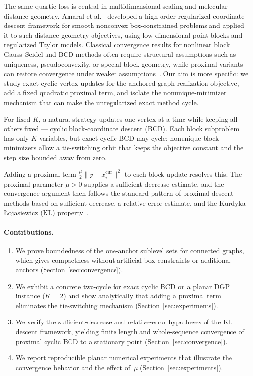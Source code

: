 \documentclass[11pt]{article}
\begin{document}
The same quartic loss is central in multidimensional scaling and molecular distance geometry.  Amaral et al.~\cite{amaral2022complexity} developed a high-order regularized coordinate-descent framework for smooth nonconvex box-constrained problems and applied it to such distance-geometry objectives, using low-dimensional point blocks and regularized Taylor models.  Classical convergence results for nonlinear block Gauss--Seidel and BCD methods often require structural assumptions such as uniqueness, pseudoconvexity, or special block geometry, while proximal variants can restore convergence under weaker assumptions~\cite{grippo2000convergence,tseng2001convergence,wright2015coordinate}.  Our aim is more specific: we study exact cyclic vertex updates for the anchored graph-realization objective, add a fixed quadratic proximal term, and isolate the nonunique-minimizer mechanism that can make the unregularized exact method cycle.

For fixed \(K\), a natural strategy updates one vertex at a time while keeping all others fixed — cyclic block-coordinate descent (BCD).  Each block subproblem has only \(K\) variables, but exact cyclic BCD may cycle: nonunique block minimizers allow a tie-switching orbit that keeps the objective constant and the step size bounded away from zero.

Adding a proximal term $\frac{\mu}{2}\|y-x_i^{\text{cur}}\|^2$ to each block update resolves this.  The proximal parameter $\mu>0$ supplies a sufficient-decrease estimate, and the convergence argument then follows the standard pattern of proximal descent methods based on sufficient decrease, a relative error estimate, and the Kurdyka--\L{}ojasiewicz (KL) property~\cite{attouch2010proximal,attouch2013convergence,bolte2014proximal}.

\paragraph{Contributions.}
\begin{enumerate}
    \item We prove boundedness of the one-anchor sublevel sets for connected graphs, which gives compactness without artificial box constraints or additional anchors (Section~\ref{sec:convergence}).
    \item We exhibit a concrete two-cycle for exact cyclic BCD on a planar DGP instance (\(K=2\)) and show analytically that adding a proximal term eliminates the tie-switching mechanism (Section~\ref{sec:experiments}).
    \item We verify the sufficient-decrease and relative-error hypotheses of the KL descent framework, yielding finite length and whole-sequence convergence of proximal cyclic BCD to a stationary point (Section~\ref{sec:convergence}).
    \item We report reproducible planar numerical experiments that illustrate the convergence behavior and the effect of~$\mu$ (Section~\ref{sec:experiments}).
\end{enumerate}
\end{document}
